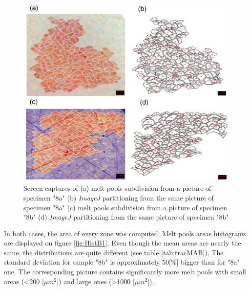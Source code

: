 \begin{figure}[ht]
\centering
\centerline{\includegraphics[scale=0.12]{Images/B1}}
\decoRule
\caption[Screen captures of (a) melt pools subdivision from a picture of specimen "8a" (b) \textit{ImageJ} partitioning from the same picture of specimen "8a" (c) melt pools subdivision from a picture of specimen "8b" (d) \textit{ImageJ} partitioning from the same picture of specimen "8b"]{Screen captures of (a) melt pools subdivision from a picture of specimen "8a" (b) \textit{ImageJ} partitioning from the same picture of specimen "8a" (c) melt pools subdivision from a picture of specimen "8b" (d) \textit{ImageJ} partitioning from the same picture of specimen "8b"}
\label{fig:B1}
\end{figure} 

In both cases, the area of every zone was computed. Melt pools areas histograms are displayed on figure \ref{fig:HistB1}. Even though the mean areas are nearly the same, the distributions are quite different (see table  \ref{tab:tracMAB}). The standard deviation for sample "8b" is approximately 50[\%] bigger than for "8a" one. The corresponding picture contains significantly more melt pools with small areas (<200 [$\mu m^2$]) and large ones (>1000 [$\mu m^2$]). \\

